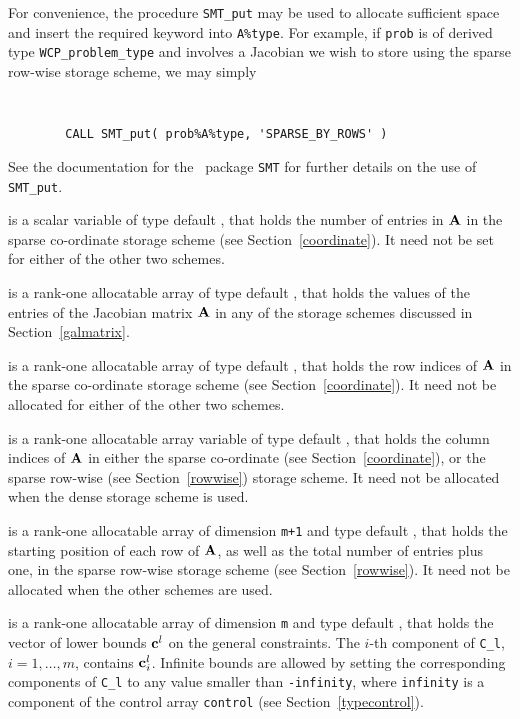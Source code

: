 \documentclass{galahad}
\newcommand{\packagename}{WCP}
\begin{document}
\begin{description}
\begin{description}
For convenience, the procedure {\tt SMT\_put} 
may be used to allocate sufficient space and insert the required keyword
into {\tt A\%type}.
For example, if {\tt prob} is of derived type {\tt \packagename\_problem\_type}
and involves a Jacobian we wish to store using the sparse row-wise 
storage scheme, we may simply
{\tt 
\begin{verbatim}
        CALL SMT_put( prob%A%type, 'SPARSE_BY_ROWS' )
\end{verbatim}
}
\noindent
See the documentation for the \galahad\ package {\tt SMT} 
for further details on the use of {\tt SMT\_put}.

 is a scalar variable of type default \integer, that 
holds the number of entries in ${\mathbf{A}}$
in the sparse co-ordinate storage scheme (see Section~\ref{coordinate}). 
It need not be set for either of the other two schemes.

 is a rank-one allocatable array of type default \realdp, that holds
the values of the entries of the Jacobian matrix ${\mathbf{A}}$ in any of the 
storage schemes discussed in Section~\ref{galmatrix}.

 is a rank-one allocatable array of type default \integer,
that holds the row indices of ${\mathbf{A}}$ in the sparse co-ordinate storage
scheme (see Section~\ref{coordinate}). 
It need not be allocated for either of the other two schemes.

 is a rank-one allocatable array variable of type default \integer,
that holds the column indices of ${\mathbf{A}}$ in either the sparse co-ordinate 
(see Section~\ref{coordinate}), or the sparse row-wise 
(see Section~\ref{rowwise}) storage scheme.
It need not be allocated when the dense storage scheme is used.

 is a rank-one allocatable array of dimension {\tt m+1} and type 
default \integer, that holds the 
starting position of each row of ${\mathbf{A}}$, as well
as the total number of entries plus one, in the sparse row-wise storage
scheme (see Section~\ref{rowwise}). It need not be allocated when the
other schemes are used.

\end{description}

 is a rank-one allocatable array of dimension {\tt m} and type 
default \realdp, that holds the vector of lower bounds ${\mathbf{c}}^{l}$ 
on the general constraints. The $i$-th component of 
{\tt C\_l}, $i = 1, \ldots , m$, contains ${\mathbf{c}}_{i}^{l}$.
Infinite bounds are allowed by setting the corresponding 
components of {\tt C\_l} to any value smaller than {\tt -infinity}, 
where {\tt infinity} is a component of the control array {\tt control} 
(see Section~\ref{typecontrol}).


\end{description}
\end{document}
